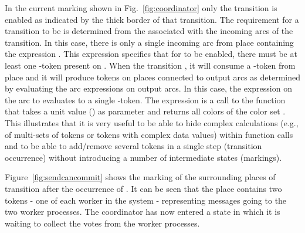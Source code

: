 
In the current marking shown in Fig.~\ref{fig:coordinator} only the
transition  is enabled as indicated by the
thick border of that transition. The requirement for a transition to
be  is determined from the 
associated with the incoming arcs of the transition. In this case,
there is only a single incoming arc from place 
containing the expression \smlcode{()}. This expression specifies that
for  to be enabled, there must be at least one
\smlcode{()}-token present on . When the
 transition , it will consume a
\smlcode{()}-token from place  and it will produce
tokens on places connected to output arcs as determined by evaluating
the arc expressions on output arcs. In this case, the expression
\smlcode{()} on the arc to  evaluates to a
single \smlcode{()}-token. The expression  is a
call to the function  that takes a unit value
(\smlcode{()}) as parameter and returns all colors of the color set
. This illustrates that it is very useful to be able
to hide complex calculations (e.g., of multi-sets of tokens or tokens
with complex data values) within function calls and to be able to
add/remove several tokens in a single step (transition occurrence)
without introducing a number of intermediate states (markings).


Figure~\ref{fig:sendcancommit} shows the marking of the surrounding
places of transition  after the occurrence of
. It can be seen that the place
 contains two tokens - one of each worker in the
system - representing messages going to the two worker processes. The
coordinator has now entered a state in which it is waiting to collect
the votes from the worker processes.

